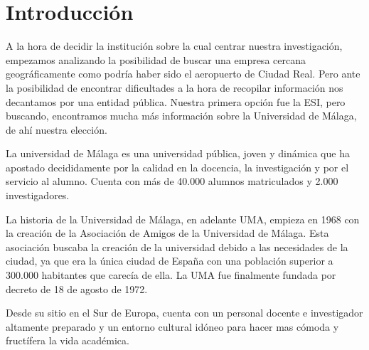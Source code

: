 \documentclass[11pt,a4paper,spanish,twoside]{book}
\begin{document}
\chapter*{Introducción}
A la hora de decidir la institución sobre la cual centrar nuestra 
investigación, empezamos analizando la posibilidad de buscar una empresa 
cercana geográficamente como podría haber sido el aeropuerto de Ciudad Real. 
Pero ante la posibilidad de encontrar dificultades a la hora de recopilar 
información nos decantamos por una entidad pública. Nuestra primera opción fue 
la ESI, pero buscando, encontramos mucha más información sobre la Universidad 
de Málaga, de ahí nuestra elección.

La universidad de Málaga es una universidad pública, joven y dinámica que ha 
apostado decididamente por la calidad en la docencia, la investigación y por el
servicio al alumno. Cuenta con más de 40.000 alumnos matriculados y 2.000 
investigadores. 

La historia de la Universidad de Málaga, en adelante UMA, empieza en 1968 con 
la creación de la Asociación de Amigos de la Universidad de Málaga. Esta 
asociación buscaba la creación de la universidad debido a las necesidades de la 
ciudad, ya que era la única ciudad de España con una población superior a 
300.000 habitantes que carecía de ella. La UMA fue finalmente 
fundada por decreto de 18 de agosto de 1972.

Desde su sitio en el Sur de Europa, cuenta con un personal docente e 
investigador altamente preparado y un entorno cultural idóneo para hacer mas 
cómoda y fructífera la vida académica.
\end{document}
